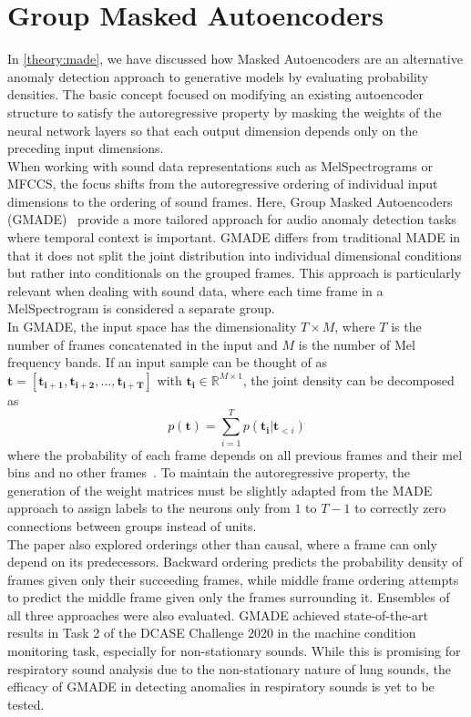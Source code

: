 \section{Group Masked Autoencoders}
In \autoref{theory:made}, we have discussed how Masked Autoencoders are an alternative anomaly detection approach to generative models by evaluating probability densities. The basic concept focused on modifying an existing autoencoder structure to satisfy the autoregressive property by masking the weights of the neural network layers so that each output dimension depends only on the preceding input dimensions.\\
When working with sound data representations such as MelSpectrograms or MFCCS, the focus shifts from the autoregressive ordering of individual input dimensions to the ordering of sound frames. Here, Group Masked Autoencoders (GMADE)~\cite{Giri2020} provide a more tailored approach for audio anomaly detection tasks where temporal context is important. GMADE differs from traditional MADE in that it does not split the joint distribution into individual dimensional conditions but rather into conditionals on the grouped frames. This approach is particularly relevant when dealing with sound data, where each time frame in a MelSpectrogram is considered a separate group.\\
In GMADE, the input space has the dimensionality $T\times M$, where $T$ is the number of frames concatenated in the input and $M$ is the number of Mel frequency bands. If an input sample can be thought of as $\mathbf{t}=[\mathbf{t_{i+1}}, \mathbf{t_{i+2}},... ,\mathbf{t_{i+T}}]$ with $\mathbf{t_{i}}\in \mathbb{R}^{M\times 1}$, the joint density can be decomposed as \[ p(\mathbf{t})=\sum_{i=1}^{T}p(\mathbf{t_i}|\mathbf{t}_{<i}) \] where the probability of each frame depends on all previous frames and their mel bins and no other frames~\cite{Giri2020}. To maintain the autoregressive property, the generation of the weight matrices must be slightly adapted from the MADE approach to assign labels to the neurons only from $1$ to $T-1$ to correctly zero connections between groups instead of units.\\
The paper also explored orderings other than causal, where a frame can only depend on its predecessors. Backward ordering predicts the probability density of frames given only their succeeding frames, while middle frame ordering attempts to predict the middle frame given only the frames surrounding it. Ensembles of all three approaches were also evaluated. GMADE achieved state-of-the-art results in Task 2 of the DCASE Challenge 2020 in the machine condition monitoring task, especially for non-stationary sounds. While this is promising for respiratory sound analysis due to the non-stationary nature of lung sounds, the efficacy of GMADE in detecting anomalies in respiratory sounds is yet to be tested.\\

